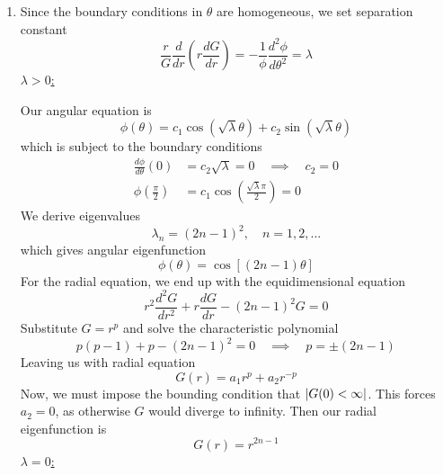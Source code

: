\documentclass[a4paper]{article}
\begin{document}
\begin{enumerate}[label=(\alph*)]
	\item Since the boundary conditions in \( \theta \) are homogeneous, we set separation constant
	\[
		\frac{r}{G}\frac{d }{d r}\!\left( r \frac{d G}{d r} \right) = -\frac{1}{\phi}\frac{d^2 \phi}{d \theta^2} = \lambda 
	\]
	\underline{\( \lambda > 0 \):}

	Our angular equation is
	\[
		\phi \!\left( \theta \right) = c_{1}\cos\!\left(\sqrt{\lambda}\theta\right) + c_{2}\sin\!\left(\sqrt{\lambda}\theta\right)
	\]
	which is subject to the boundary conditions
	\begin{align*}
		\frac{d \phi}{d \theta}\!\left( 0 \right) & = c_{2}\sqrt{\lambda} = 0 \quad \implies \quad c_{2} = 0 \\
		\phi \!\left( \frac{\pi}{2} \right) & = c_{1}\cos\!\left(\frac{\sqrt{\lambda}\pi}{2}\right) = 0
	\end{align*}
	We derive eigenvalues
	\[
		\lambda_{n} = \!\left( 2n - 1 \right)^{2}, \quad n = 1, 2, ...
	\]
	which gives angular eigenfunction
	\[
		\phi \!\left( \theta \right) = \cos\!\left[\!\left( 2n - 1 \right)\theta\right]
	\]
	For the radial equation, we end up with the equidimensional equation
	\[
		r^{2}\frac{d^2 G}{d r^2} + r \frac{d G}{d r} - \!\left( 2n - 1 \right)^{2}G = 0
	\]
	Substitute \( G = r^{p} \) and solve the characteristic polynomial
	\[
		 p \!\left( p - 1 \right) + p - \!\left( 2n - 1 \right)^{2} = 0 \quad \implies \quad p = \pm \!\left( 2n - 1 \right)
	\]
	Leaving us with radial equation
	\[
		G \!\left( r \right) = a_{1}r^{p} + a_{2}r^{-p}
	\]
	Now, we must impose the bounding condition that \( \abs{G \!\left( 0 \right) < \infty} \). This forces \( a_{2} = 0 \), as otherwise \( G \) would diverge to infinity. Then our radial eigenfunction is
	\[
		G \!\left( r \right) = r^{2n - 1}
	\]
	\underline{\( \lambda = 0 \):}


\end{enumerate}
\end{document}
